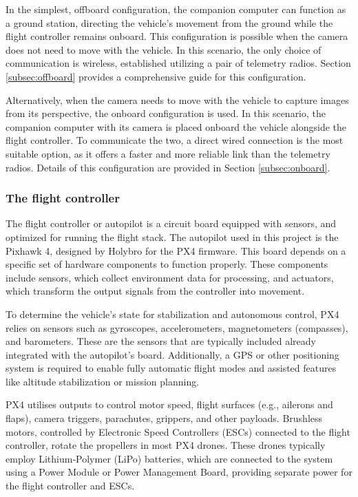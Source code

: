In the simplest, offboard configuration, the companion computer can function as a ground station, directing the vehicle's movement from the ground while the flight controller remains onboard. This configuration is possible when the camera does not need to move with the vehicle. In this scenario, the only choice of communication is wireless, established utilizing a pair of telemetry radios. Section \ref{subsec:offboard} provides a comprehensive guide for this configuration.

Alternatively, when the camera needs to move with the vehicle to capture images from its perspective, the onboard configuration is used. In this scenario, the companion computer with its camera is placed onboard the vehicle alongside the flight controller. To communicate the two, a direct wired connection is the most suitable option, as it offers a faster and more reliable link than the telemetry radios. Details of this configuration are provided in Section \ref{subsec:onboard}.

\subsubsection{The flight controller}


The flight controller or autopilot is a circuit board equipped with sensors, and optimized for running the flight stack.
The autopilot used in this project is the Pixhawk 4, designed by Holybro for the PX4 firmware.
This board depends on a specific set of hardware components to function properly.
These components include sensors, which collect environment data for processing, and actuators, which transform the output signals from the controller into movement.

To determine the vehicle's state for stabilization and autonomous control, PX4 relies on sensors such as gyroscopes, accelerometers, magnetometers (compasses), and barometers.
These are the sensors that are typically included already integrated with the autopilot's board.
Additionally, a GPS or other positioning system is required to enable fully automatic flight modes and assisted features like altitude stabilization or mission planning.

PX4 utilises outputs to control motor speed, flight surfaces (e.g., ailerons and flaps), camera triggers, parachutes, grippers, and other payloads. Brushless motors, controlled by Electronic Speed Controllers (ESCs) connected to the flight controller, rotate the propellers in most PX4 drones. These drones typically employ Lithium-Polymer (LiPo) batteries, which are connected to the system using a Power Module or Power Management Board, providing separate power for the flight controller and ESCs. 

